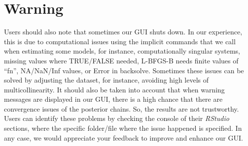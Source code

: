 \section{Warning}\label{secGUI7}

Users should also note that sometimes our GUI shuts down. In our experience, this is due to computational issues using the implicit commands that we call when estimating some models, for instance, computationally singular systems, missing values where TRUE/FALSE needed, L-BFGS-B needs finite values of ``fn'', NA/NaN/Inf values, or Error in backsolve. Sometimes these issues can be solved by adjusting the dataset, for instance, avoiding high levels of multicollinearity. It should also be taken into account that when warning messages are displayed in our GUI, there is a high chance that there are convergence issues of the posterior chains. So, the results are not trustworthy. Users can identify these problems by checking the console of their \textit{RStudio} sections, where the specific folder/file where the issue happened is specified. In any case, we would appreciate your feedback to improve and enhance our GUI.
